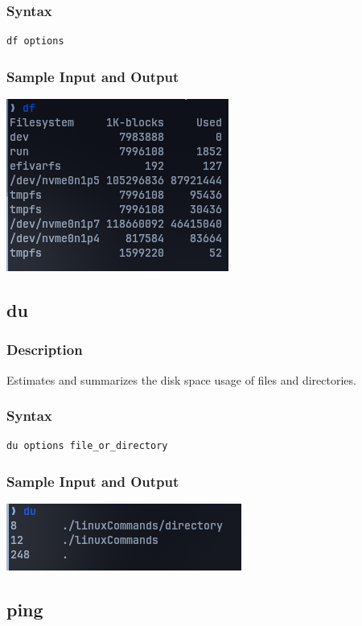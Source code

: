 \subsubsection{Syntax}
\begin{verbatim}
df options
\end{verbatim}

\subsubsection{Sample Input and Output}
\includegraphics[]{Cycle_1//Outputs/df.png}


\subsection{du}
\subsubsection{Description}
Estimates and summarizes the disk space usage of files and directories.

\subsubsection{Syntax}
\begin{verbatim}
du options file_or_directory
\end{verbatim}

\subsubsection{Sample Input and Output}
\includegraphics[width=0.5\linewidth]{Cycle_1//Outputs/du.png}

\subsection{ping}
